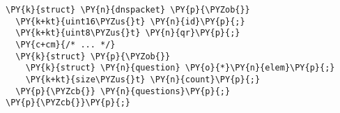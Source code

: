 \begin{Verbatim}[commandchars=\\\{\},codes={\catcode`\$=3\catcode`\^=7\catcode`\_=8}]
\PY{k}{struct} \PY{n}{dnspacket} \PY{p}{\PYZob{}}
  \PY{k+kt}{uint16\PYZus{}t} \PY{n}{id}\PY{p}{;}
  \PY{k+kt}{uint8\PYZus{}t} \PY{n}{qr}\PY{p}{;}
  \PY{c+cm}{/* ... */}
  \PY{k}{struct} \PY{p}{\PYZob{}}
    \PY{k}{struct} \PY{n}{question} \PY{o}{*}\PY{n}{elem}\PY{p}{;}
    \PY{k+kt}{size\PYZus{}t} \PY{n}{count}\PY{p}{;}
  \PY{p}{\PYZcb{}} \PY{n}{questions}\PY{p}{;}
\PY{p}{\PYZcb{}}\PY{p}{;}
\end{Verbatim}
